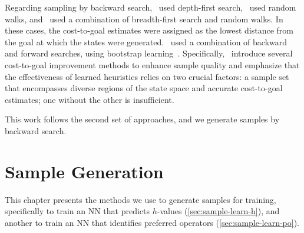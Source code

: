 \documentclass[ppgc,diss,english]{iiufrgs}
\begin{document}
Regarding sampling by backward search,~\citet{Yu.etal/2020} used depth-first search,~\citet{OToole/2022} used random walks, and~\citet{Bettker.etal/2022} used a combination of breadth-first search and random walks. In these cases, the cost-to-goal estimates were assigned as the lowest distance from the goal at which the states were generated.~\citet{Ferber.etal/2022} used a combination of backward and forward searches, using bootstrap learning~\cite{Arfaee.etal/2011}.
Specifically,~\citet{Bettker.etal/2022} introduce several cost-to-goal improvement methods to enhance sample quality and emphasize that the effectiveness of learned heuristics relies on two crucial factors: a sample set that encompasses diverse regions of the state space and accurate cost-to-goal estimates; one without the other is insufficient.

This work follows the second set of approaches, and we generate samples by backward search.




%
%
\chapter{Sample Generation}
\label{cha:sample-gen}
This chapter presents the methods we use to generate samples for training, specifically to train an NN that predicts $h$-values (\cref{sec:sample-learn-h}), and another to train an NN that identifies preferred operators (\cref{sec:sample-learn-po}).
\end{document}
